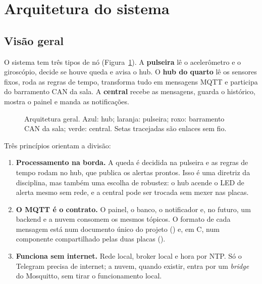 \section{Arquitetura do sistema}\label{sec:arquitetura}
\subsection{Visão geral}

O sistema tem três tipos de nó (Figura~\ref{fig:arquitetura}). A \textbf{pulseira} lê o
acelerômetro e o giroscópio, decide se houve queda e avisa o hub. O \textbf{hub do quarto}
lê os sensores fixos, roda as regras de tempo, transforma tudo em mensagens MQTT e participa
do barramento CAN da sala. A \textbf{central} recebe as mensagens, guarda o histórico,
mostra o painel e manda as notificações.

\begin{figure}[H]
\centering
\resizebox{\linewidth}{!}{}
\caption{Arquitetura geral. Azul: hub; laranja: pulseira; roxo: barramento CAN da sala;
verde: central. Setas tracejadas são enlaces sem fio.}
\label{fig:arquitetura}
\end{figure}

Três princípios orientam a divisão:

\begin{enumerate}
  \item \textbf{Processamento na borda.} A queda é decidida na pulseira e as regras de tempo
        rodam no hub, que publica os alertas prontos. Isso é uma diretriz da disciplina, mas
        também uma escolha de robustez: o hub acende o LED de alerta mesmo sem rede, e a
        central pode ser trocada sem mexer nas placas.
  \item \textbf{O MQTT é o contrato.} O painel, o banco, o notificador e, no futuro, um
        backend e a nuvem consomem os mesmos tópicos. O formato de cada mensagem está num
        documento único do projeto () e, em C, num componente
        compartilhado pelas duas placas ().
  \item \textbf{Funciona sem internet.} Rede local, broker local e hora por NTP. Só o
        Telegram precisa de internet; a nuvem, quando existir, entra por um \textit{bridge}
        do Mosquitto, sem tirar o funcionamento local.
\end{enumerate}

